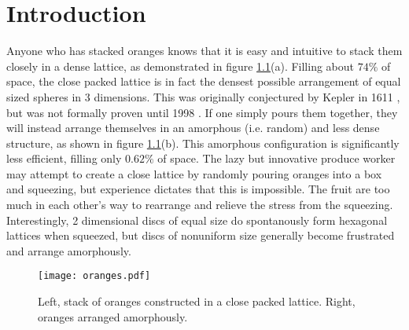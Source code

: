 \chapter{Introduction}


Anyone who has stacked oranges knows that it is easy and intuitive to stack them closely in a dense lattice, as demonstrated in figure \ref{plot:oranges}(a). Filling about $74\%$ of space, the close packed lattice is in fact the densest possible arrangement of equal sized spheres in 3 dimensions. This was originally conjectured by Kepler in 1611 \cite{kepler_strena_1611}, but was not formally proven until 1998 \cite{hales_overview_1998}. If one simply pours them together, they will instead arrange themselves in an amorphous (i.e. random) and less dense structure, as shown in figure \ref{plot:oranges}(b). This amorphous configuration is significantly less efficient, filling only $0.62\%$ of space. The lazy but innovative produce worker may attempt to create a close lattice by randomly pouring oranges into a box and squeezing, but experience dictates that this is impossible. The fruit are too much in each other's way to rearrange and relieve the stress from the squeezing. Interestingly, 2 dimensional discs of equal size do spontanously form hexagonal lattices when squeezed, but discs of nonuniform size generally become frustrated and arrange amorphously.

\begin{figure}[b!]

\texttt{[image: oranges.pdf]}

\caption{Left, stack of oranges constructed in a close packed lattice. Right, oranges arranged amorphously. }

\label{plot:oranges}
\end{figure}

